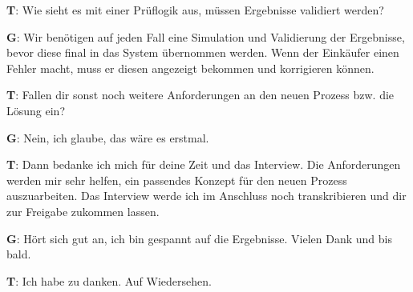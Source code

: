 \begin{list}{X:}{\setlength{\labelsep}{5mm}}
 \item[\textbf{T}:] Wie sieht es mit einer Prüflogik aus, müssen Ergebnisse validiert werden?
 \item[\textbf{G}:] Wir benötigen auf jeden Fall eine Simulation und Validierung der Ergebnisse, bevor diese final in das System übernommen werden. Wenn der Einkäufer einen Fehler macht, muss er diesen angezeigt bekommen und korrigieren können. 
 \item[\textbf{T}:] Fallen dir sonst noch weitere Anforderungen an den neuen Prozess bzw. die Lösung ein?
 \item[\textbf{G}:] Nein, ich glaube, das wäre es erstmal.
 \item[\textbf{T}:] Dann bedanke ich mich für deine Zeit und das Interview. Die Anforderungen werden mir sehr helfen, ein passendes Konzept für den neuen Prozess auszuarbeiten. Das Interview werde ich im Anschluss noch transkribieren und dir zur Freigabe zukommen lassen.
 \item[\textbf{G}:] Hört sich gut an, ich bin gespannt auf die Ergebnisse. Vielen Dank und bis bald.
 \item[\textbf{T}:] Ich habe zu danken. Auf Wiedersehen.     
\end{list}